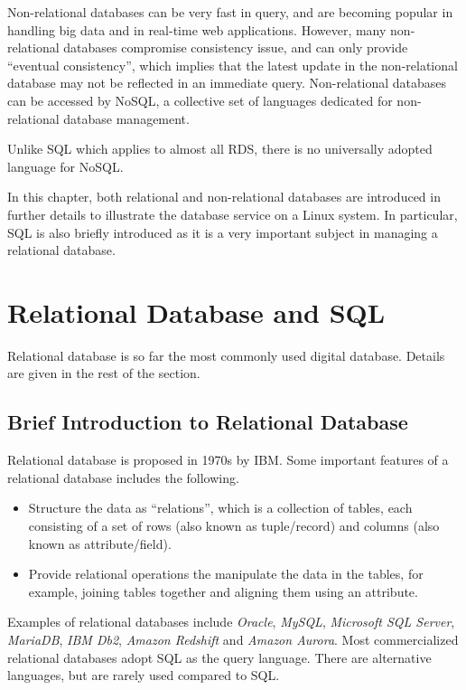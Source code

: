 Non-relational databases can be very fast in query, and are becoming popular in handling big data and in real-time web applications. However, many non-relational databases compromise consistency issue, and can only provide ``eventual consistency'', which implies that the latest update in the non-relational database may not be reflected in an immediate query. Non-relational databases can be accessed by NoSQL, a collective set of languages dedicated for non-relational database management.

Unlike SQL which applies to almost all RDS, there is no universally adopted language for NoSQL.

In this chapter, both relational and non-relational databases are introduced in further details to illustrate the database service on a Linux system. In particular, SQL is also briefly introduced as it is a very important subject in managing a relational database.

\section{Relational Database and SQL}

Relational database is so far the most commonly used digital database. Details are given in the rest of the section.

\subsection{Brief Introduction to Relational Database}

Relational database is proposed in 1970s by IBM. Some important features of a relational database includes the following.
\begin{itemize}
  \item Structure the data as ``relations'', which is a collection of tables, each consisting of a set of rows (also known as tuple/record) and columns (also known as attribute/field).
  \item Provide relational operations the manipulate the data in the tables, for example, joining tables together and aligning them using an attribute.
\end{itemize}

Examples of relational databases include \textit{Oracle}, \textit{MySQL}, \textit{Microsoft SQL Server}, \textit{MariaDB}, \textit{IBM Db2}, \textit{Amazon Redshift} and \textit{Amazon Aurora}. Most commercialized relational databases adopt SQL as the query language. There are alternative languages, but are rarely used compared to SQL.

